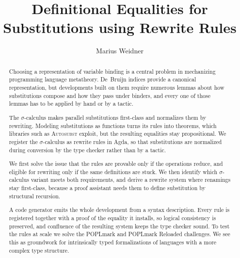 \documentclass[sigplan,anonymous,review]{acmart}
\theoremstyle{acmdefinition}
\begin{document}
\title{Definitional Equalities for Substitutions using Rewrite Rules}

\author{Marius Weidner}






\begin{abstract}

  Choosing a representation of variable binding is a central problem in
  mechanizing programming language metatheory. De~Bruijn indices provide a
  canonical representation, but developments built on them require numerous
  lemmas about how substitutions compose and how they pass under binders, and
  every one of those lemmas has to be applied by hand or by a tactic.

  The $σ$-calculus makes parallel substitutions first-class and normalizes them
  by rewriting. Modeling substitutions as functions turns its rules into
  theorems, which libraries such as \textsc{Autosubst} exploit, but the resulting
  equalities stay propositional. We register the $σ$-calculus as rewrite rules in
  Agda, so that substitutions are normalized during conversion by the type
  checker rather than by a tactic.

  We first solve the issue that the rules are provable only if the operations
  reduce, and eligible for rewriting only if the same definitions are stuck. We
  then identify which $σ$-calculus variant meets both requirements, and derive a
  rewrite system where renamings stay first-class, because a proof assistant
  needs them to define substitution by structural recursion.

  A code generator emits the whole development from a syntax description. Every
  rule is registered together with a proof of the equality it installs, so
  logical consistency is preserved, and confluence of the resulting system keeps
  the type checker sound. To test the rules at scale we solve the POPLmark and
  POPLmark Reloaded challenges. We see this as groundwork for intrinsically typed
  formalizations of languages with a more complex type structure.
\end{abstract}

\maketitle
\end{document}
